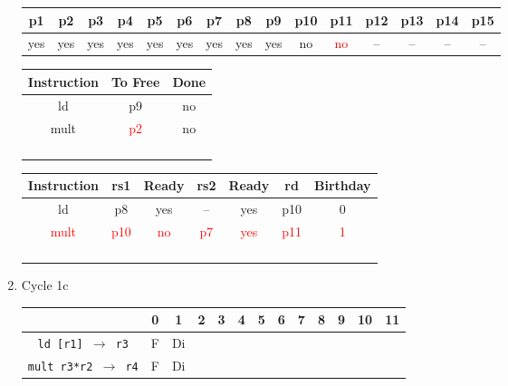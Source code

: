 \documentclass[12pt]{article}
\begin{document}
\begin{enumerate}
\begin{table}[H]
\begin{tabular}{|c|c|c|c|c|c|c|c|c|c|c|c|c|c|c|}
					\hline
					p1 & p2 & p3 & p4 & p5 & p6 & p7 & p8 & p9 & p10 & p11 & p12 & p13 & p14 & p15\\
					\hline
					yes & yes & yes & yes & yes & yes & yes & yes & yes & no & \textcolor{red}{no} & -- & -- & -- & --\\
					\hline
				\end{tabular}
			\end{table}
			\begin{table}[H]
				\begin{tabular}{|c|c|c|}
					\hline
					Instruction & To Free & Done\\
					\hline
					ld & p9 & no\\
					\hline
					mult & \textcolor{red}{p2}& no\\
					\hline
					 & & \\
					\hline
					 & & \\
					\hline
					 & & \\
					\hline
					 & & \\
					\hline
				\end{tabular}
				\hfill
				\begin{tabular}{|c|c|c|c|c|c|c|}
					\hline
					Instruction & rs1 & Ready & rs2 & Ready & rd & Birthday\\
					\hline
					ld & p8 & yes & -- & yes & p10 & 0\\
					\hline
					\textcolor{red}{mult} & \textcolor{red}{p10} & \textcolor{red}{no} & \textcolor{red}{p7} & \textcolor{red}{yes} & \textcolor{red}{p11} & \textcolor{red}{1}\\
					\hline
					 &  &  &  &  &  & \\
					\hline
					 &  &  &  &  &  & \\
					\hline
					 &  &  &  &  &  & \\
					\hline
					 &  &  &  &  &  & \\
					\hline
				\end{tabular}
			\end{table}
		\item
			Cycle 1c
			\begin{table}[H]
				\begin{tabular}{|c|c|c|c|c|c|c|c|c|c|c|c|c|}
					\hline
					 & 0 & 1 & 2 & 3 & 4 & 5 & 6 & 7 & 8 & 9 & 10 & 11\\
					\hline
					\texttt{ld [r1] $\rightarrow$ r3} & F & Di &  &  &  &  &  &  &  &  &  &\\
					\hline
					\texttt{mult r3*r2 $\rightarrow$ r4} & F & Di &  &  &  &  &  &  &  &  &  &\\

\end{tabular}
\end{table}
\end{enumerate}
\end{document}
